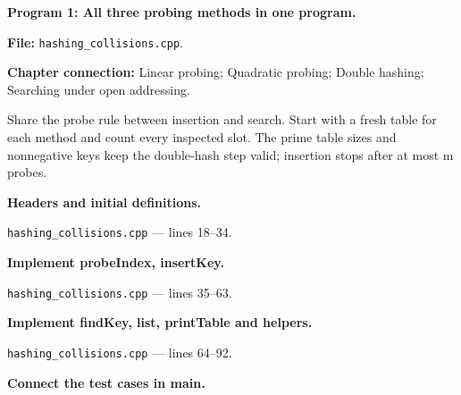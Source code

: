 \textbf{Program 1: All three probing methods in one program.}

\textbf{File:} \texttt{hashing\_collisions.cpp}.

\textbf{Chapter connection:} Linear probing; Quadratic probing; Double hashing; Searching under open addressing.

Share the probe rule between insertion and search. Start with a fresh table for each method and count every inspected slot. The prime table sizes and nonnegative keys keep the double-hash step valid; insertion stops after at most m probes.



\begin{utpsteps}\setcounter{enumi}{0}\item \textbf{Headers and initial definitions.}\end{utpsteps}

\texttt{hashing\_collisions.cpp} --- lines 18--34.




\tcbbreak

\begin{utpsteps}\setcounter{enumi}{1}\item \textbf{Implement probeIndex, insertKey.}\end{utpsteps}

\texttt{hashing\_collisions.cpp} --- lines 35--63.






\tcbbreak

\begin{utpsteps}\setcounter{enumi}{2}\item \textbf{Implement findKey, list, printTable and helpers.}\end{utpsteps}

\texttt{hashing\_collisions.cpp} --- lines 64--92.




\tcbbreak

\begin{utpsteps}\setcounter{enumi}{3}\item \textbf{Connect the test cases in main.}\end{utpsteps}

